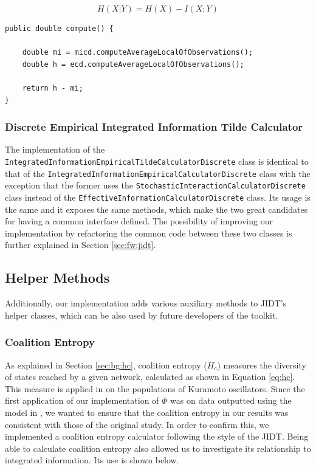 \documentclass[a4paper,11pt]{article}
\begin{document}
\begin{equation} \label{eq:ce}
H(X|Y) = H(X) - I(X; Y)
\end{equation}

\begin{verbatim}
public double compute() {

	double mi = micd.computeAverageLocalOfObservations();
	double h = ecd.computeAverageLocalOfObservations();

	return h - mi;
}
\end{verbatim}

\subsubsection{Discrete Empirical Integrated Information Tilde Calculator}
\label{sec:impl:ii-tilde:calculator}

The implementation of the \texttt{IntegratedInformationEmpiricalTildeCalculatorDiscrete} class is identical to that of the \texttt{IntegratedInformationEmpiricalCalculatorDiscrete} class with the exception that the former uses the \texttt{StochasticInteractionCalculatorDiscrete} class instead of the \texttt{EffectiveInformationCalculatorDiscrete} class. Its usage is the same and it exposes the same methods, which make the two great candidates for having a common interface defined. The possibility of improving our implementation by refactoring the common code between these two classes is further explained in Section \ref{sec:fw:jidt}.

\subsection{Helper Methods}
Additionally, our implementation adds various auxiliary methods to JIDT's helper classes, which can be also used by future developers of the toolkit.

\subsubsection{Coalition Entropy}
\label{sec:impl:hc}

As explained in Section \ref{sec:bg:hc}, coalition entropy ($H_c$) measures the diversity of states reached by a given network, calculated as shown in Equation \ref{eq:hc}. This measure is applied in \cite{Shanahan2010} on the populations of Kuramoto oscillators. Since the first application of our implementation of $\Phi$ was on data outputted using the model in \cite{Shanahan2010}, we wanted to ensure that the coalition entropy in our results was consistent with those of the original study. In order to confirm this, we implemented a coalition entropy calculator following the style of the JIDT. Being able to calculate coalition entropy also allowed us to investigate its relationship to integrated information. Its use is shown below.
\end{document}
